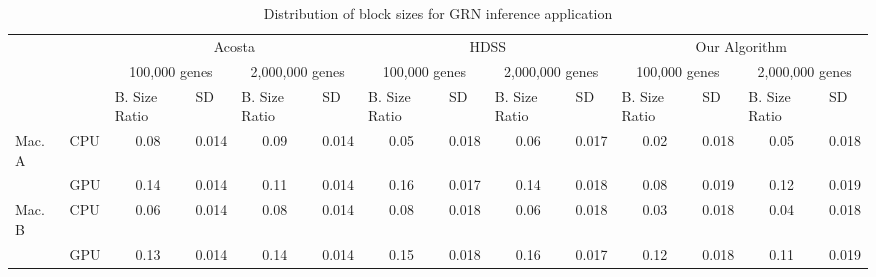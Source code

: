 \documentclass[journal]{IEEEtran}
\begin{document}
\begin{table}[htb]
\centering
\caption{Distribution of block sizes for GRN inference application}
\begin{scriptsize}
\begin{tabular}{|l|l|l|l|l|l|l|l|l|l|l|l|l|l|}
\cline{3-14}
\multicolumn{1}{l}{} &  & \multicolumn{4}{c|}{Acosta} & \multicolumn{4}{c|}{HDSS} & \multicolumn{4}{c|}{Our Algorithm} \\ 
\cline{3-14}
\multicolumn{1}{l}{} &  & \multicolumn{2}{c|}{100,000 genes} & \multicolumn{2}{c|}{2,000,000 genes} & \multicolumn{2}{c|}{100,000 genes} & \multicolumn{2}{c|}{2,000,000 genes} & \multicolumn{2}{c|}{100,000 genes} & \multicolumn{2}{c|}{2,000,000 genes} \\ 
\cline{3-14}
\multicolumn{1}{l}{} &  & B. Size Ratio & SD & B. Size Ratio & SD & B. Size Ratio & SD & B. Size Ratio & SD & B. Size Ratio & SD & B. Size Ratio & SD \\ 
\hline
Mac. A & CPU & \multicolumn{1}{c|}{0.08} & \multicolumn{1}{c|}{0.014} & \multicolumn{1}{c|}{0.09} & \multicolumn{1}{c|}{0.014} & \multicolumn{1}{c|}{0.05} & \multicolumn{1}{c|}{0.018} & \multicolumn{1}{c|}{0.06} & \multicolumn{1}{c|}{0.017} & \multicolumn{1}{c|}{0.02} & \multicolumn{1}{c|}{0.018} & \multicolumn{1}{c|}{0.05} & \multicolumn{1}{c|}{0.018} \\ 
\cline{2-14}
 & GPU & \multicolumn{1}{c|}{0.14} & \multicolumn{1}{c|}{0.014} & \multicolumn{1}{c|}{0.11} & \multicolumn{1}{c|}{0.014} & \multicolumn{1}{c|}{0.16} & \multicolumn{1}{c|}{0.017} & \multicolumn{1}{c|}{0.14} & \multicolumn{1}{c|}{0.018} & \multicolumn{1}{c|}{0.08} & \multicolumn{1}{c|}{0.019} & \multicolumn{1}{c|}{0.12} & \multicolumn{1}{c|}{0.019} \\ 
\hline
Mac. B & CPU & \multicolumn{1}{c|}{0.06} & \multicolumn{1}{c|}{0.014} & \multicolumn{1}{c|}{0.08} & \multicolumn{1}{c|}{0.014} & \multicolumn{1}{c|}{0.08} & \multicolumn{1}{c|}{0.018} & \multicolumn{1}{c|}{0.06} & \multicolumn{1}{c|}{0.018} & \multicolumn{1}{c|}{0.03} & \multicolumn{1}{c|}{0.018} & \multicolumn{1}{c|}{0.04} & \multicolumn{1}{c|}{0.018} \\ 
\cline{2-14}
 & GPU & \multicolumn{1}{c|}{0.13} & \multicolumn{1}{c|}{0.014} & \multicolumn{1}{c|}{0.14} & \multicolumn{1}{c|}{0.014} & \multicolumn{1}{c|}{0.15} & \multicolumn{1}{c|}{0.018} & \multicolumn{1}{c|}{0.16} & \multicolumn{1}{c|}{0.017} & \multicolumn{1}{c|}{0.12} & \multicolumn{1}{c|}{0.018} & \multicolumn{1}{c|}{0.11} & \multicolumn{1}{c|}{0.019} \\ 

\end{tabular}
\end{scriptsize}
\end{table}
\end{document}
